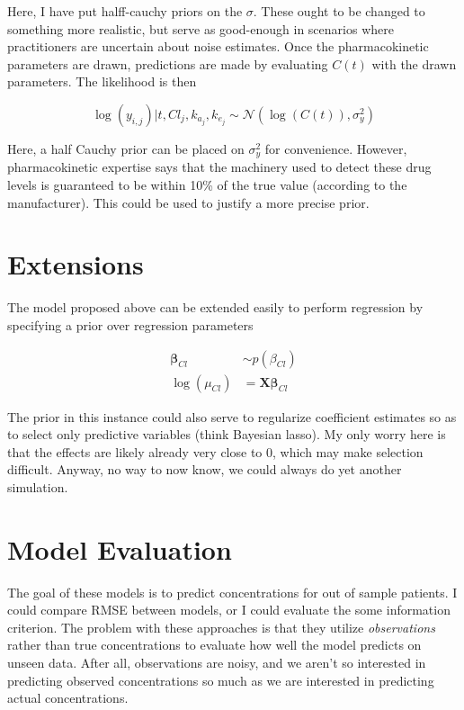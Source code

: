 \documentclass[12pt,a4paper]{book}
\begin{document}
 \noindent Here, I have put halff-cauchy priors on the $ \sigma $.  These ought to be changed to something more realistic, but serve as good-enough in scenarios where practitioners are uncertain about noise estimates.  Once the pharmacokinetic parameters are drawn, predictions are made by evaluating $C(t)$ with the drawn parameters.  The likelihood is then
 
  \begin{equation}
 \log(y_{i,j}) \vert t, Cl_{j}, k_{a_j}, k_{e_j} \sim \mathcal{N}(\log(C(t)), \sigma^2_y)
 \end{equation}
 
 Here, a half Cauchy prior can be placed on $\sigma^2_y$ for convenience.  However, pharmacokinetic expertise says that the machinery used to detect these drug levels is guaranteed to be within 10\% of the true value (according to the manufacturer). This could be used to justify a more precise prior.
 
\section{Extensions}

The model proposed above can be extended easily to perform regression by specifying a prior over regression parameters 

\begin{align}
	\bm{\beta}_{Cl} &\sim p(\beta_{Cl})\\
	\log(\mu_{Cl}) &= \mathbf{X}\bm{\beta}_{Cl}
\end{align}

\noindent The prior in this instance could also serve to regularize coefficient estimates so as to select only predictive variables (think Bayesian lasso).  My only worry here is that the effects are likely already very close to 0, which may make selection difficult.  Anyway, no way to now know, we could always do yet another simulation.


\section{Model Evaluation}

The goal of these models is to predict concentrations for out of sample patients.  I could compare RMSE between models, or I could evaluate the some information criterion.  The problem with these approaches is that they utilize \textit{observations} rather than true concentrations to evaluate how well the model predicts on unseen data.  After all, observations are noisy, and we aren't so interested in predicting observed concentrations so much as we are interested in predicting actual concentrations.
\end{document}
